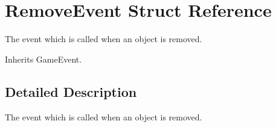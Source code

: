 \hypertarget{struct_remove_event}{\section{Remove\-Event Struct Reference}
\label{struct_remove_event}
}


The event which is called when an object is removed.  




Inherits Game\-Event.



\subsection{Detailed Description}
The event which is called when an object is removed. 

